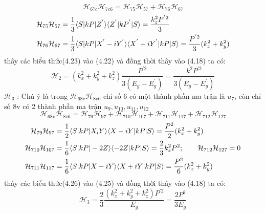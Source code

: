 \begin{equation}
\mathcal{H}_{67c}\mathcal{H}_{7c6}=\mathcal{H}_{75}\mathcal{H}_{57} +\mathcal{H}_{76}\mathcal{H}_{67}
\end{equation}
\begin{align}
\mathcal{H}_{75}\mathcal{H}_{57}&=\frac{1}{3}\langle S|kP|Z^{'}\rangle\langle Z^{'}|kP^{'}|S\rangle = \frac{k_z^2P^{'2}}{3}\notag \\
\mathcal{H}_{76}\mathcal{H}_{67}&=\frac{1}{3}\langle S|kP|X^{'}-iY^{'}\rangle\langle X^{'}+iY^{'}|kP|S\rangle = \frac{P^{'2}}{3}(k_x^2  +k_y^2)
\end{align}
thây các biểu thức(4.23) vào (4.22) và đồng thời thây vào (4.18) ta có:
\begin{equation}
\mathcal{H}_{2} =\left( k_x^2 + k_y^2 + k_z^2\right)\frac{P^{'2}}{3(E_g -E_g^{'})} = \frac{k^2P^{'2}}{3(E_g -E_g^{'})}
\end{equation}
$\mathcal{H}_3$ : Chú ý là trong $\mathcal{H}_{68v}\mathcal{H}_{8v6}$ chỉ số 6 có một thành phần ma trận là $u_7$, còn chỉ số 8v có 2 thành phần ma trận $u_9,u_{10},u_{11},u_{12}$
\begin{equation}
\mathcal{H}_{68v}\mathcal{H}_{8v6}=\mathcal{H}_{79}\mathcal{H}_{97} +\mathcal{H}_{710}\mathcal{H}_{107} +\mathcal{H}_{711}\mathcal{H}_{117} +\mathcal{H}_{712}\mathcal{H}_{127}
\end{equation}
\begin{align}
\mathcal{H}_{79}\mathcal{H}_{97}&=\frac{1}{2}\langle S|kP|X_iY\rangle\langle X-iY|kP|S\rangle =
\frac{P^{2}}{2}(k_x^2 +k_y^2)\notag\\
\mathcal{H}_{710}\mathcal{H}_{107} &=\frac{1}{6}\langle S |kP|-2Z\rangle \langle -2Z|kP| S \rangle = \frac{2}{3}k_z^2P^{2};\qquad \mathcal{H}_{712}\mathcal{H}_{127}=0\notag\\
\mathcal{H}_{711}\mathcal{H}_{117} &=\frac{1}{6}\langle S |kP|X-iY\rangle \langle X+iY|kP| S \rangle = \frac{P^{2}}{6}(k_x^2 +k_y^2)
\end{align}
thây các biểu thức(4.26) vào (4.25) và đồng thời thây vào (4.18) ta có:
\begin{equation}
\mathcal{H}_3 =\frac{2}{3}\frac{(k_x^2 +k_y^2 +k_z^2)P^{'2}}{E_g}=\frac{2P^2}{3E_g}
\end{equation}


